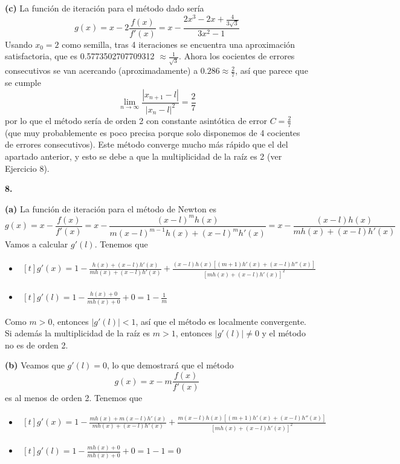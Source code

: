 \documentclass[12pt]{report}
\begin{document}
\vspace{2mm}
\textbf{(c) } La función de iteración para el método dado sería
\[g(x) = x - 2\frac{f(x)}{f'(x)} = x - \frac{2x^3-2x+\frac{4}{3\sqrt{3}}}{3x^2-1}\]
Usando $x_0 = 2$ como semilla, tras 4 iteraciones se encuentra una aproximación satisfactoria, que es 0.5773502707709312 $\approx \frac{1}{\sqrt{3}}$. Ahora los cocientes de errores consecutivos se van acercando (aproximadamente) a $0.286 \approx \frac{2}{7}$, así que parece que se cumple
\[\lim_{n \to \infty} \frac{|x_{n+1}-l|}{|x_n-l|^2} = \frac{2}{7}\]
por lo que el método sería de orden 2 con constante asintótica de error $C = \frac{2}{7}$ (que muy probablemente es poco precisa porque solo disponemos de 4 cocientes de errores consecutivos). Este método converge mucho más rápido que el del apartado anterior, y esto se debe a que la multiplicidad de la raíz es 2 (ver Ejercicio 8).

\vspace{6mm}
\textbf{8. }

\vspace{2mm}
\textbf{(a) } La función de iteración para el método de Newton es
\[g(x) = x - \frac{f(x)}{f'(x)} = x - \frac{(x-l)^mh(x)}{m(x-l)^{m-1}h(x)+(x-l)^mh'(x)} = x - \frac{(x-l)h(x)}{mh(x) + (x-l)h'(x)}\]
Vamos a calcular $g'(l)$. Tenemos que
\begin{itemize}
    \item
    $
    \begin{aligned}[t]
        g'(x) = 1 - \frac{h(x) + (x-l)h'(x)}{mh(x) + (x-l)h'(x)} + \frac{(x-l)h(x)[(m+1)h'(x)+(x-l)h''(x)]}{[mh(x)+(x-l)h'(x)]^2}
    \end{aligned}
    $
    \item
    $
    \begin{aligned}[t]
        g'(l) = 1-\frac{h(x)+0}{mh(x)+0}+0=1-\frac{1}{m}
    \end{aligned}
    $ 
\end{itemize}
Como $m>0$, entonces $|g'(l)|<1$, así que el método es localmente convergente. Si además la multiplicidad de la raíz es $m > 1$, entonces $|g'(l)| \neq 0$ y el método no es de orden 2.

\vspace{2mm}

\textbf{(b) } Veamos que $g'(l)=0$, lo que demostrará que el método 
\[g(x) = x-m\frac{f(x)}{f'(x)}\]
es al menos de orden 2. Tenemos que
\begin{itemize}
    \item
    $
    \begin{aligned}[t]
        g'(x) = 1 - \frac{mh(x) + m(x-l)h'(x)}{mh(x) + (x-l)h'(x)} + \frac{m(x-l)h(x)[(m+1)h'(x)+(x-l)h''(x)]}{[mh(x)+(x-l)h'(x)]^2}
    \end{aligned}
    $
    \item
    $
    \begin{aligned}[t]
        g'(l) = 1-\frac{mh(x)+0}{mh(x)+0}+0 = 1-1=0
    \end{aligned}
    $ 
\end{itemize}
\end{document}
